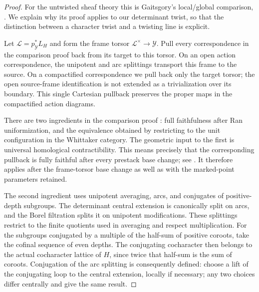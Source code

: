 \begin{proof}
For the untwisted sheaf theory this is Gaitsgory's local/global comparison,
\cite[Theorems~5.5.2 and~7.2.3]{GaitsgoryWhit}. We explain why its proof
applies to our determinant twist, so that the distinction between a
character twist and a twisting line is explicit.

Let $\mathcal L=p_{\mathcal Y}^*L_H$ and form the frame torsor
$\mathcal L^\times\to\mathcal Y$. Pull every correspondence in the
comparison proof back from its target to this torsor. On an open
action correspondence, the unipotent and arc splittings transport this
frame to the source. On a compactified correspondence we pull back only
the target torsor; the open source-frame identification is not extended
as a trivialization over its boundary. This single Cartesian pullback
preserves the proper maps in the compactified action diagrams.

There are two ingredients in the comparison proof
\cite[Sections~6.1--6.6]{GaitsgoryWhit}: full faithfulness after Ran
uniformization, and the equivalence obtained by restricting to the unit
configuration in the Whittaker category. The geometric input to the first
is universal homological contractibility. This means precisely that the
corresponding pullback is fully faithful after every prestack base change;
see \cite[Appendix~A.1.8--A.1.11]{GaitsgorySemiInfiniteII}. It therefore
applies after the frame-torsor base change as well as with the marked-point
parameters retained.

The second ingredient uses unipotent averaging, arcs, and conjugates of
positive-depth subgroups. The determinant central extension is canonically
split on arcs, and the Borel filtration splits it on unipotent
modifications. These splittings restrict to the finite quotients used in
averaging and respect multiplication. For the subgroups conjugated by a
multiple of the half-sum of positive coroots, take the cofinal sequence of
even depths. The conjugating cocharacter then belongs to the actual
cocharacter lattice of $H$, since twice that half-sum is the sum of
coroots. Conjugation of the arc splitting is consequently defined: choose
a lift of the conjugating loop to the central extension, locally if
necessary; any two choices differ centrally and give the same result.


\end{proof}
